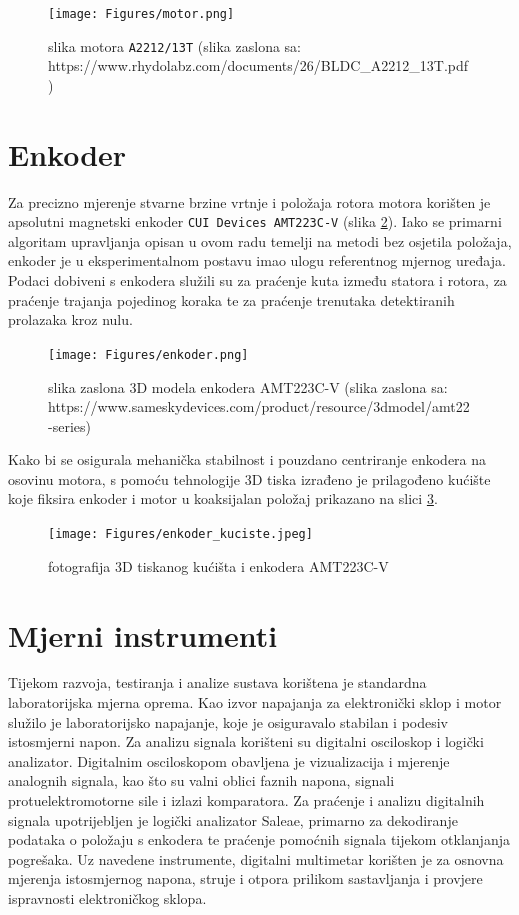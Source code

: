 \documentclass[diplomskirad]{fer}
\begin{document}
\begin{figure}[h!]
	\centering
	\texttt{[image: Figures/motor.png]}
	\caption{slika motora \texttt{A2212/13T} (slika zaslona sa: https://www.rhydolabz.com/documents/26/BLDC\_A2212\_13T.pdf)}
	\label{fig:enkoder}
\end{figure}

\section{Enkoder}
\label{sec:enkoder}

Za precizno mjerenje stvarne brzine vrtnje i položaja rotora motora korišten je
apsolutni magnetski enkoder \texttt{CUI Devices AMT223C-V} (slika
\ref{fig:enkoder}). Iako se primarni algoritam upravljanja opisan u ovom radu
temelji na metodi bez osjetila položaja, enkoder je u eksperimentalnom postavu
imao ulogu referentnog mjernog uređaja. Podaci dobiveni s enkodera služili su
za praćenje kuta između statora i rotora, za praćenje trajanja pojedinog koraka
te za praćenje trenutaka detektiranih prolazaka kroz nulu.

\begin{figure}[h!]
	\centering
	\texttt{[image: Figures/enkoder.png]}
	\caption{slika zaslona 3D modela enkodera AMT223C-V (slika zaslona sa: https://www.sameskydevices.com/product/resource/3dmodel/amt22-series)}
	\label{fig:enkoder}
\end{figure}

Kako bi se osigurala mehanička stabilnost i pouzdano centriranje enkodera na
osovinu motora, s pomoću tehnologije 3D tiska izrađeno je prilagođeno kućište
koje fiksira enkoder i motor u koaksijalan položaj prikazano na slici
\ref{fig:enkoder_kuciste}.

\begin{figure}[h!]
	\centering
	\texttt{[image: Figures/enkoder\_kuciste.jpeg]}
	\caption{fotografija 3D tiskanog kućišta i enkodera AMT223C-V}
	\label{fig:enkoder_kuciste}
\end{figure}

\section{Mjerni instrumenti}
\label{sec:mjerni_instrumenti}

Tijekom razvoja, testiranja i analize sustava korištena je standardna
laboratorijska mjerna oprema. Kao izvor napajanja za elektronički sklop i motor
služilo je laboratorijsko napajanje, koje je osiguravalo stabilan i podesiv
istosmjerni napon. Za analizu signala korišteni su digitalni osciloskop i
logički analizator. Digitalnim osciloskopom obavljena je vizualizacija i
mjerenje analognih signala, kao što su valni oblici faznih napona, signali
protuelektromotorne sile i izlazi komparatora. Za praćenje i analizu digitalnih
signala upotrijebljen je logički analizator Saleae, primarno za dekodiranje
podataka o položaju s enkodera te praćenje pomoćnih signala tijekom otklanjanja
pogrešaka. Uz navedene instrumente, digitalni multimetar korišten je za osnovna
mjerenja istosmjernog napona, struje i otpora prilikom sastavljanja i provjere
ispravnosti elektroničkog sklopa.
\end{document}
